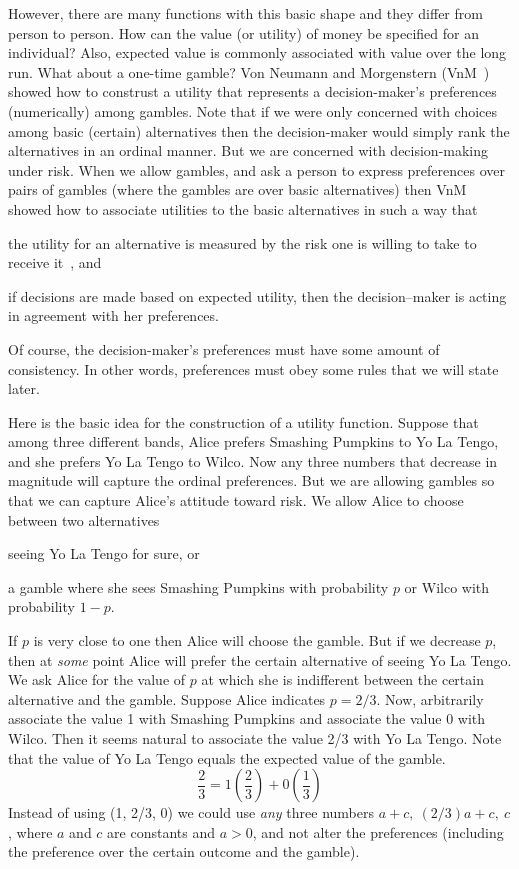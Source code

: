 However, there are many functions with this basic shape and they
differ from person to person. How can the value (or utility) of money
be specified for an individual? Also, expected value is commonly
associated with value over the long run. What about a one-time
gamble? Von Neumann and Morgenstern (VnM~\cite{vonneumann:1953})
showed how to construst a utility that
represents a decision-maker's preferences (numerically) among gambles. Note that if
we were only concerned with choices among basic (certain) alternatives
then the decision-maker would simply rank the alternatives in an
ordinal manner. But we are concerned with decision-making under
risk. When we allow gambles, and ask a person to express preferences
over pairs of gambles (where the gambles are over basic alternatives)
then VnM showed how to associate utilities to the basic alternatives
in such a way that 
\begin{inparaenum}[1)] 
\item the utility for an alternative is measured by
the risk one is willing to take to receive it~\cite{savage:1972}, and
\item if decisions are made based on expected utility, then the
decision--maker is acting in agreement with her preferences.
\end{inparaenum}
Of course, the decision-maker's preferences must have some amount of
consistency. In other words, preferences must obey some rules that we
will state later.

Here is the basic idea for the construction of a utility function.
Suppose that among three different bands, Alice prefers
Smashing Pumpkins to Yo La Tengo, and she prefers Yo La Tengo to Wilco.
Now any three numbers that decrease in magnitude will capture
the ordinal preferences. But we are allowing gambles so that
we can capture Alice's attitude toward risk. We allow Alice
to choose between two alternatives 
\begin{inparaenum}[1)]
\item seeing Yo La Tengo for sure, or 
\item a gamble where she sees Smashing Pumpkins with probability
$p$ or Wilco with probability $1-p$. 
\end{inparaenum}
If $p$ is very close to one then Alice will choose the gamble. But if we
decrease $p$, then at \emph{some} point Alice will prefer the certain
alternative of seeing Yo La Tengo. We ask Alice for the value of
$p$ at which she is indifferent between the certain alternative and
the gamble. Suppose Alice indicates
$p=2/3$. Now, arbitrarily associate the value 1 with Smashing Pumpkins
and associate the value 0 with Wilco. Then it seems natural to
associate the value 2/3 with Yo La Tengo. Note that the value of Yo La
Tengo equals the expected value of the gamble.
\[ \frac{2}{3} = 1\left(\frac{2}{3}\right) +
  0\left(\frac{1}{3}\right) \] Instead of using (1, 2/3, 0) we could
use \emph{any} three numbers $a+c,~(2/3)a+c,~c$, where $a$ and
$c$ are constants and
$a>0$, and not alter the preferences (including the preference over the
certain outcome and the gamble).

